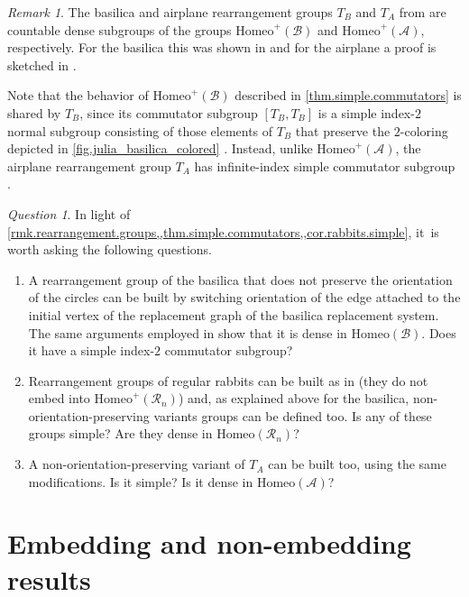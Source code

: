 \documentclass[JEP,XML,SOM,Unicode,NoFloatCountersInSection,published]{cedram}
\theoremstyle{plain}
\theoremstyle{definition}
\theoremstyle{remark}
\newtheorem{remark}[theorem]{Remark}
\newtheorem{question}[theorem]{Question}
\newcommand{\Homeo}{\mathrm{Homeo}}
\newcommand{\A}{\mathcal{A}}
\newcommand{\B}{\mathcal{B}}
\newcommand{\R}{\mathcal{R}}
\begin{document}
\begin{remark}
\label{rmk.rearrangement.groups}
The basilica and airplane rearrangement groups $T_B$ and $T_A$ from \cite{BF15,Belk-Forrest,airplane} are countable dense subgroups of the groups $\Homeo^+(\B)$ and $\Homeo^+(\A)$, respectively.
For the basilica this was shown in \cite{Neretin} and for the airplane a proof is sketched in \cite[\S 7.3]{dendriterearrangement}.

Note that the behavior of $\Homeo^+(\B)$ described in \cref{thm.simple.commutators} is shared by $T_B$, since its commutator subgroup $[T_B, T_B]$ is a simple index-$2$ normal subgroup consisting of those elements of $T_B$ that preserve the $2$-coloring depicted in \cref{fig.julia_basilica_colored} \cite[\S 8]{BF15}.
Instead, unlike $\Homeo^+(\A)$, the airplane rearrangement group $T_A$ has infinite-index simple commutator subgroup \cite[Cor.\,7.4 \& Th.\,7.8]{airplane}.
\end{remark}

\begin{question}
In light of \cref{rmk.rearrangement.groups,,thm.simple.commutators,,cor.rabbits.simple}, it~is worth asking the following questions.
\begin{enumerate}
\item A rearrangement group of the basilica that does not preserve the orientation of the circles can be built by switching orientation of the edge attached to the initial vertex of the replacement graph of the basilica replacement system.
The same arguments employed in \cite{Neretin,dendriterearrangement} show that it is dense in $\Homeo(\B)$.
Does it have a simple index-$2$ commutator subgroup?
\item Rearrangement groups of regular rabbits can be built as in \cite[Ex.\,2.3]{Belk-Forrest} (they do not embed into $\Homeo^+(\R_n)$) and, as explained above for the basilica, non-orientation-preserving variants groups can be defined too.
Is any of these groups simple?
Are they dense in $\Homeo(\R_n)$?
\item A non-orientation-preserving variant of $T_A$ can be built too, using the same modifications.
Is it simple?
Is it dense in $\Homeo(\A)$?
\end{enumerate}
\end{question}

\section{Embedding and non-embedding results}
\label{sec.embedding}
\end{document}
